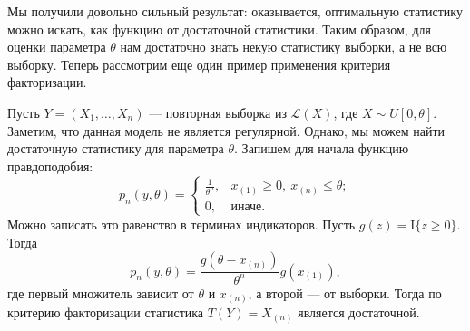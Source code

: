 Мы получили довольно сильный результат: оказывается, оптимальную статистику можно искать, как функцию от достаточной статистики. Таким образом, для оценки параметра $\theta$ нам достаточно знать некую статистику выборки, а не всю выборку. Теперь рассмотрим еще один пример применения критерия факторизации.

\begin{example}
    Пусть $Y = (X_1, \ldots, X_n)$ --- повторная выборка из $\mathcal{L}(X)$, где $X \sim U[0, \theta]$. Заметим, что данная модель не является регулярной. Однако, мы можем найти достаточную статистику для параметра $\theta$. Запишем для начала функцию правдоподобия:
    \[
        p_n(y, \theta) = \begin{cases} \frac{1}{\theta^n}, & x_{(1)} \geqslant 0,\  x_{(n)} \leqslant \theta; \\ 0, & \text{иначе}. \end{cases}
    \]
    Можно записать это равенство в терминах индикаторов. Пусть $g(z) = \mathrm{I}\{z \geqslant 0\}$. Тогда
    \[
        p_n(y, \theta) = \frac{g(\theta - x_{(n)})}{\theta^n} g(x_{(1)}),
    \]
    где первый множитель зависит от $\theta$ и $x_{(n)}$, а второй --- от выборки. Тогда по критерию факторизации статистика $T(Y) = X_{(n)}$ является достаточной.
\end{example}